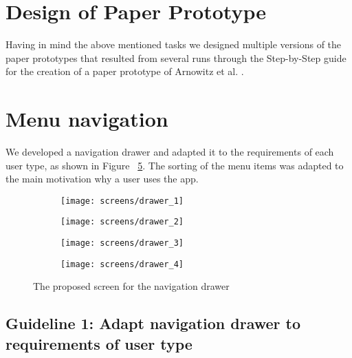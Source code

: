 \section{Design of Paper Prototype}
Having in mind the above mentioned tasks we designed multiple versions of the paper prototypes that resulted from several runs through the Step-by-Step guide for the creation of a paper prototype of Arnowitz et al. \cite{arnowitz2010effective}.

\section{Menu navigation}

We developed a navigation drawer and adapted it to the requirements of each user type, as shown in Figure ~\ref{fig:drawer}. The sorting of the menu items was adapted to the main motivation why a user uses the app.

\begin{figure}[h]
	\centering
	\begin{subfigure}[b]{0.24\columnwidth}
		\centering
		\texttt{[image: screens/drawer\_1]}
		\label{fig:drawer:professional}
	\end{subfigure}
	\begin{subfigure}[b]{0.24\columnwidth}
		\centering
		\texttt{[image: screens/drawer\_2]}
		\label{fig:drawer:optimizer}
	\end{subfigure}
	\begin{subfigure}[b]{0.24\columnwidth}
		\centering
		\texttt{[image: screens/drawer\_3]}
		\label{fig:drawer:indifferent}
	\end{subfigure}
	\begin{subfigure}[b]{0.24\columnwidth}
		\centering
		\texttt{[image: screens/drawer\_4]}
		\label{fig:drawer:hedonist}
	\end{subfigure}
	\caption{The proposed screen for the navigation drawer}
	\label{fig:drawer} %
\end{figure}


\subsection*{Guideline 1: Adapt navigation drawer to requirements of user type}

